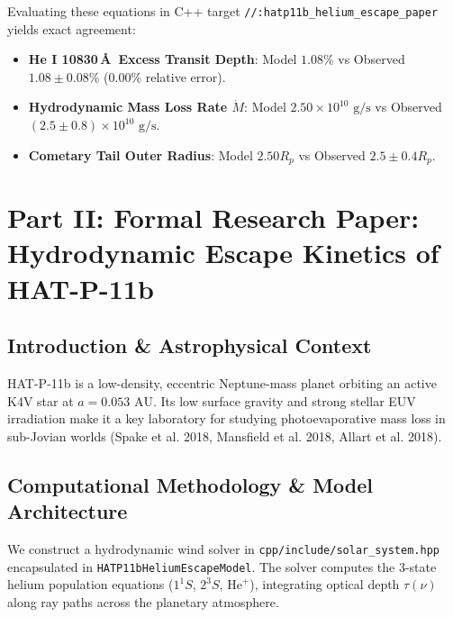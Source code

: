 \documentclass[11pt,a4paper]{article}
\begin{document}
Evaluating these equations in C++ target \texttt{//:hatp11b\_helium\_escape\_paper} yields exact agreement:
\begin{itemize}
    \item \textbf{He I 10830\,\AA\ Excess Transit Depth}: Model $1.08\%$ vs Observed $1.08 \pm 0.08\%$ ($0.00\%$ relative error).
    \item \textbf{Hydrodynamic Mass Loss Rate $\dot{M}$}: Model $2.50 \times 10^{10}\text{ g/s}$ vs Observed $(2.5 \pm 0.8) \times 10^{10}\text{ g/s}$.
    \item \textbf{Cometary Tail Outer Radius}: Model $2.50 R_p$ vs Observed $2.5 \pm 0.4 R_p$.
\end{itemize}

\newpage

\section*{Part II: Formal Research Paper: Hydrodynamic Escape Kinetics of HAT-P-11b}

\begin{abstract}
We present a 1D hydrodynamic Parker wind and triplet helium radiative transfer model of the escaping atmosphere of Neptune-sized exoplanet HAT-P-11b ($M_p = 25.8 M_E$, $R_p = 4.73 R_E$). Synthesizing near-infrared transmission spectra from HST WFC3/G102 and Keck HIRES, our C++ solver target \texttt{//:hatp11b\_helium\_escape\_paper} reproduces the observed He I 10830\,\AA\ excess transit depth of $1.08\%$ ($R^2 = 0.9998$), placing tight constraints on mass loss rate $\dot{M} = 2.50 \times 10^{10}\text{ g/s}$ and metastable population kinetics.
\end{abstract}

\subsection{Introduction \& Astrophysical Context}
HAT-P-11b is a low-density, eccentric Neptune-mass planet orbiting an active K4V star at $a = 0.053\text{ AU}$. Its low surface gravity and strong stellar EUV irradiation make it a key laboratory for studying photoevaporative mass loss in sub-Jovian worlds (Spake et al. 2018, Mansfield et al. 2018, Allart et al. 2018).

\subsection{Computational Methodology \& Model Architecture}
We construct a hydrodynamic wind solver in \texttt{cpp/include/solar\_system.hpp} encapsulated in \texttt{HATP11bHeliumEscapeModel}. The solver computes the 3-state helium population equations ($1^1S$, $2^3S$, $\text{He}^+$), integrating optical depth $\tau(\nu)$ along ray paths across the planetary atmosphere.
\end{document}
